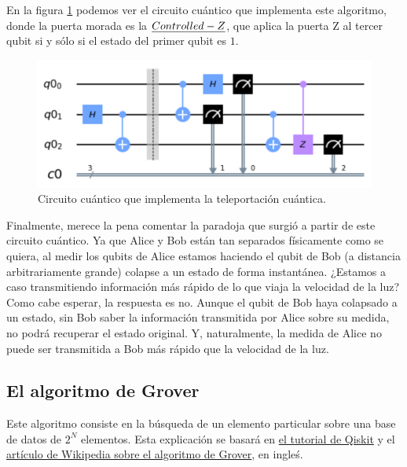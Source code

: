 \documentclass[11pt]{article}
\theoremstyle{plain}
\begin{document}
En la figura \ref{fig-teleportation} podemos ver el circuito cuántico que implementa este algoritmo, donde la puerta morada es la $\emph{Controlled-Z}$, que aplica la puerta Z al tercer qubit si y sólo si el estado del primer qubit es $1$.

\begin{figure}[H]
	\centering
	\includegraphics[scale=0.7]{figures/teleportation-circuit.pdf}
	\caption{Circuito cuántico que implementa la teleportación cuántica.}
	\label{fig-teleportation}
\end{figure}

Finalmente, merece la pena comentar la paradoja que surgió a partir de este circuito cuántico. Ya que Alice y Bob están tan separados físicamente como se quiera, al medir los qubits de Alice estamos haciendo el qubit de Bob (a distancia arbitrariamente grande) colapse a un estado de forma instantánea. ¿Estamos a caso transmitiendo información más rápido de lo que viaja la velocidad de la luz? \\

Como cabe esperar, la respuesta es no. Aunque el qubit de Bob haya colapsado a un estado, sin Bob saber la información transmitida por Alice sobre su medida, no podrá recuperar el estado original. Y, naturalmente, la medida de Alice no puede ser transmitida a Bob más 
rápido que la velocidad de la luz.


\subsection{El algoritmo de Grover}

Este algoritmo consiste en la búsqueda de un elemento particular sobre una base de datos de $2^N$ elementos. Esta explicación se basará en \href{https://qiskit.org/textbook/ch-algorithms/grover.html}{el tutorial de Qiskit} y el \href{https://en.wikipedia.org/wiki/Grover\%27s_algorithm}{artículo de Wikipedia sobre el algoritmo de Grover}, en ingleś. \\
\end{document}
